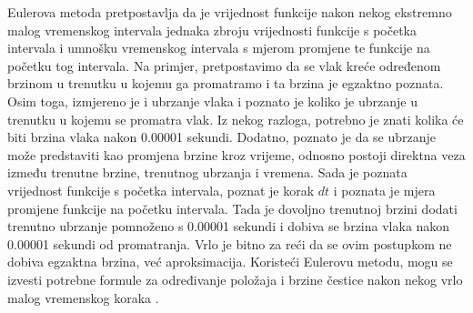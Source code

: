 \documentclass{foi}
\begin{document}
Eulerova metoda pretpostavlja da je vrijednost funkcije nakon nekog ekstremno malog vremenskog intervala jednaka zbroju vrijednosti funkcije s početka intervala i umnošku vremenskog intervala s mjerom promjene te funkcije  na početku tog intervala. Na primjer, pretpostavimo da se vlak kreće određenom brzinom u trenutku u kojemu ga promatramo i ta brzina je egzaktno poznata. Osim toga, izmjereno je i ubrzanje vlaka i poznato je koliko je ubrzanje u trenutku u kojemu se promatra vlak. Iz nekog razloga, potrebno je znati kolika će biti brzina vlaka nakon 0.00001 sekundi. Dodatno, poznato je da se ubrzanje može predstaviti kao promjena brzine kroz vrijeme, odnosno postoji direktna veza između trenutne brzine, trenutnog ubrzanja i vremena. Sada je poznata vrijednost funkcije s početka intervala, poznat je korak $dt$ i poznata je mjera promjene funkcije na početku intervala. Tada je dovoljno trenutnoj brzini dodati trenutno ubrzanje pomnoženo s 0.00001 sekundi i dobiva se brzina vlaka nakon 0.00001 sekundi od promatranja. Vrlo je bitno za reći da se ovim postupkom ne dobiva egzaktna brzina, već aproksimacija. Koristeći Eulerovu metodu, mogu se izvesti potrebne formule za određivanje položaja i brzine čestice nakon nekog vrlo malog vremenskog koraka \parencite{EulersMethod2013}.
\end{document}

